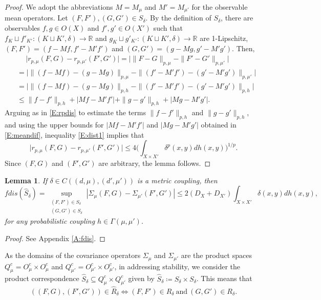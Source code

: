 \documentclass[11pt]{article}
\newtheorem{lemma}[theorem]{Lemma}
\theoremstyle{definition}
\newcommand{\real}{\ensuremath{\mathbb{R}}}
\newcommand{\obs}[1]{\ensuremath{O(#1)}}
\newcommand{\cobs}[1]{\ensuremath{O^c_{#1}}}
\newcommand{\pcobs}[1]{\ensuremath{Q^c_{#1}}}
\newcommand{\mean}[1]{\ensuremath{M_\mathcal{#1}}}
\newcommand{\dlp}[1]{\ensuremath{r_{p,#1}}}
\begin{document}
\begin{proof}
We adopt the abbreviations $M = \mean{\mu}$ and $M' = \mean{\mu'}$ for the observable mean operators. Let $(F,F'), (G,G') \in S_\delta$. By the definition of $S_\delta$, there are observables $f,g \in \obs{X}$ and $f',g' \in \obs{X'}$ such that $f_K \sqcup f'_{K'}\colon (K \sqcup K', \delta) \to \real$ and $g_K \sqcup g'_{K'}\colon (K \sqcup K', \delta) \to \real$ are 1-Lipschitz, $(F,F') = (f-Mf, f'-M'f')$ and $(G,G')= (g-Mg, g'-M'g')$. Then,
\begin{equation} \label{E:dist1}
\begin{split}
&\quad \ \big|\dlp{\mu} (F,G) - \dlp{\mu'} (F',G')\big| 
= \big|\|F-G\|_{p,\mu} - \|F'-G'\|_{p,\mu'}\big|\\
&= \big|\| (f-Mf) - (g-Mg)\|_{p,\mu} - \| (f'-M'f') - (g'-M'g')\|_{p,\mu'}\big| \\
&= \big|\| (f-Mf) - (g-Mg)\|_{p,h} - \| (f'-M'f') - (g'-M'g')\|_{p,h}\big| \\
&\leq \|f-f'\|_{p,h} + |Mf-M'f'| +  \|g-g'\|_{p,h} + |Mg - M'g'|.
\end{split}
\end{equation}
Arguing as in \eqref{E:rpdis} to estimate the terms $\|f-f'\|_{p,h}$ and $\|g-g'\|_{p,h}$, and using the upper bounds for $|Mf-M'f'|$ and $|Mg-M'g'|$ obtained in \eqref{E:meandif}, inequality \eqref{E:dist1} implies that
\begin{equation}
\big|\dlp{\mu} (F,G) - \dlp{\mu'} (F',G')\big| \leq
4 \Big( \int_{X \times X'} \delta^p (x,y) dh (x,y) \Big)^{1/p}.
\end{equation}
Since $(F,G)$ and $(F',G')$ are arbitrary, the lemma follows.
\end{proof}

\begin{lemma} \label{L:fdis}
If $\delta \in C((d,\mu),(d',\mu'))$ is a metric coupling, then
\[
fdis(\hat{S}_\delta) = \sup_{\substack{(F,F') \in S_\delta \\ (G,G') \in S_\delta}}
|\Sigma_\mu (F,G) - \Sigma_{\mu'} (F',G')| \leq 2(D_X + D_{X'})
\int_{X \times X'} \delta (x,y) dh (x,y),
\]
for any probabilistic coupling $h \in \Gamma(\mu,\mu')$.
\end{lemma}

\begin{proof}
See Appendix \ref{A:fdis}.
\end{proof}

As the domains of the covariance operators $\Sigma_\mu$ and $\Sigma_{\mu'}$ are the product spaces $\pcobs{\mu} = \cobs{\mu} \times \cobs{\mu}$ and $\pcobs{\mu'} = \cobs{\mu'} \times \cobs{\mu'}$, in addressing stability, we consider the product correspondence $\hat{S}_\delta \subseteq \pcobs{\mu} \times \pcobs{\mu'}$ given by $\hat{S}_\delta \coloneq S_\delta \times S_\delta$. This means that
\begin{equation} \label{E:prodcor}
((F,G),(F',G')) \in \hat{R}_\delta \iff (F,F') \in R_\delta 
\ \text{and} \ (G,G') \in R_\delta.
\end{equation}
\end{document}

